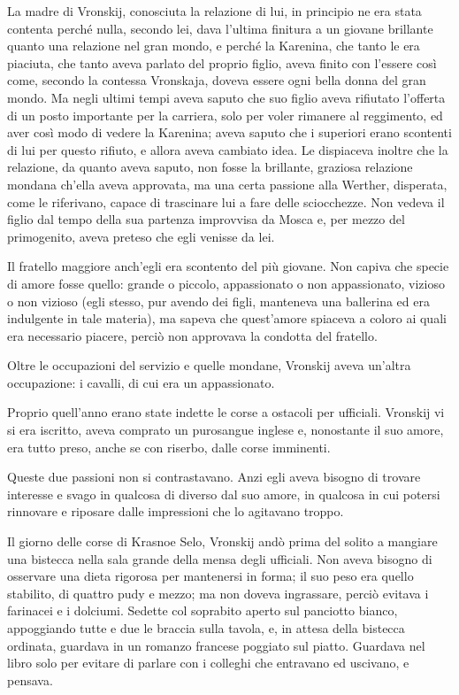 La madre di Vronskij, conosciuta la relazione di lui, in principio ne era stata contenta perché nulla, secondo lei, dava l'ultima finitura a un giovane brillante quanto una relazione nel gran mondo, e perché la Karenina, che tanto le era piaciuta, che tanto aveva parlato del proprio figlio, aveva finito con l'essere così come, secondo la contessa Vronskaja, doveva essere ogni bella donna del gran mondo. Ma negli ultimi tempi aveva saputo che suo figlio aveva rifiutato l'offerta di un posto importante per la carriera, solo per voler rimanere al reggimento, ed aver così modo di vedere la Karenina; aveva saputo che i superiori erano scontenti di lui per questo rifiuto, e allora aveva cambiato idea. Le dispiaceva inoltre che la relazione, da quanto aveva saputo, non fosse la brillante, graziosa relazione mondana ch'ella aveva approvata, ma una certa passione alla Werther, disperata, come le riferivano, capace di trascinare lui a fare delle sciocchezze. Non vedeva il figlio dal tempo della sua partenza improvvisa da Mosca e, per mezzo del primogenito, aveva preteso che egli venisse da lei. 

Il fratello maggiore anch'egli era scontento del più giovane. Non capiva che specie di amore fosse quello: grande o piccolo, appassionato o non appassionato, vizioso o non vizioso (egli stesso, pur avendo dei figli, manteneva una ballerina ed era indulgente in tale materia), ma sapeva che quest'amore spiaceva a coloro ai quali era necessario piacere, perciò non approvava la condotta del fratello. 

Oltre le occupazioni del servizio e quelle mondane, Vronskij aveva un'altra occupazione: i cavalli, di cui era un appassionato. 

Proprio quell'anno erano state indette le corse a ostacoli per ufficiali. Vronskij vi si era iscritto, aveva comprato un purosangue inglese e, nonostante il suo amore, era tutto preso, anche se con riserbo, dalle corse imminenti. 

Queste due passioni non si contrastavano. Anzi egli aveva bisogno di trovare interesse e svago in qualcosa di diverso dal suo amore, in qualcosa in cui potersi rinnovare e riposare dalle impressioni che lo agitavano troppo. 

\label{xix-1} 

Il giorno delle corse di Krasnoe Selo, Vronskij andò prima del solito a mangiare una bistecca nella sala grande della mensa degli ufficiali. Non aveva bisogno di osservare una dieta rigorosa per mantenersi in forma; il suo peso era quello stabilito, di quattro pudy e mezzo; ma non doveva ingrassare, perciò evitava i farinacei e i dolciumi. Sedette col soprabito aperto sul panciotto bianco, appoggiando tutte e due le braccia sulla tavola, e, in attesa della bistecca ordinata, guardava in un romanzo francese poggiato sul piatto. Guardava nel libro solo per evitare di parlare con i colleghi che entravano ed uscivano, e pensava. 

